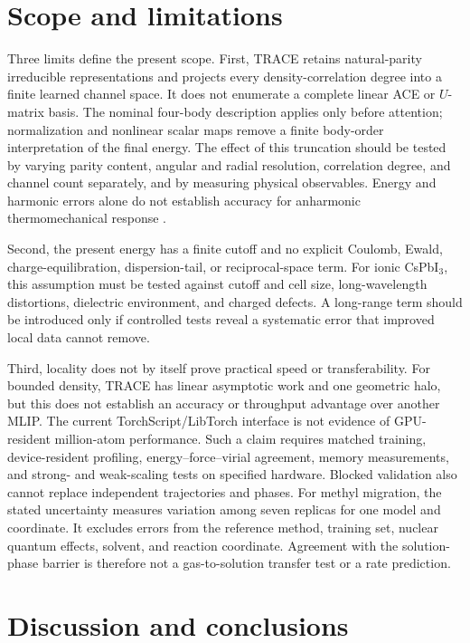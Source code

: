 \documentclass[aps,prx,preprint,notitlepage,superscriptaddress,nofootinbib,floatfix]{revtex4-2}
\begin{document}
\section{Scope and limitations}

Three limits define the present scope. First, TRACE retains
natural-parity irreducible representations and projects every
density-correlation degree into a finite learned channel space. It does not
enumerate a complete linear ACE or $U$-matrix basis. The nominal four-body
description applies only before attention; normalization and nonlinear scalar
maps remove a finite body-order interpretation of the final energy. The effect
of this truncation should be tested by varying parity content, angular and
radial resolution, correlation degree, and channel count separately, and by
measuring physical observables. Energy and harmonic errors alone do not
establish accuracy for anharmonic thermomechanical response
\cite{pota2024thermal}.

Second, the present energy has a finite cutoff and no explicit
Coulomb, Ewald, charge-equilibration, dispersion-tail, or reciprocal-space
term. For ionic CsPbI$_3$, this assumption must be tested against cutoff and
cell size, long-wavelength distortions, dielectric environment, and charged
defects. A long-range term should be introduced only if controlled tests reveal
a systematic error that improved local data cannot remove.

Third, locality does not by itself prove practical speed or
transferability. For bounded density, TRACE has linear asymptotic work and one
geometric halo, but this does not establish an accuracy or throughput advantage
over another MLIP. The current TorchScript/LibTorch interface is not evidence
of GPU-resident million-atom performance. Such a claim requires matched
training, device-resident profiling, energy--force--virial agreement, memory
measurements, and strong- and weak-scaling tests on specified hardware.
Blocked validation also cannot replace independent trajectories and phases.
For methyl migration, the stated uncertainty measures variation among seven
replicas for one model and coordinate. It excludes errors from the reference
method, training set, nuclear quantum effects, solvent, and reaction
coordinate. Agreement with the solution-phase barrier is therefore not a
gas-to-solution transfer test or a rate prediction.

\section{Discussion and conclusions}
\end{document}
